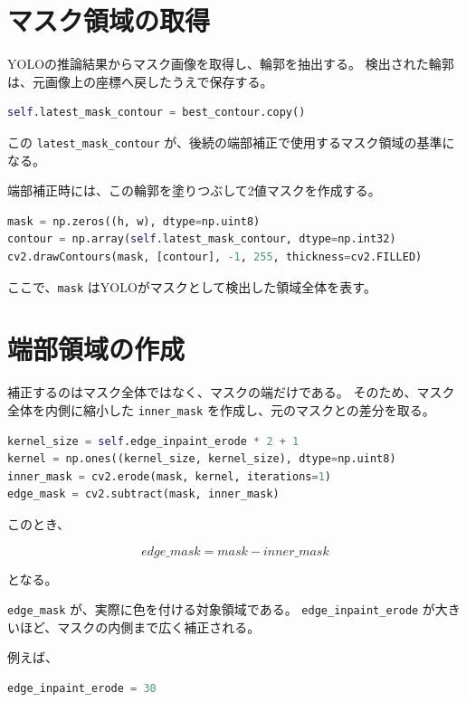\documentclass[uplatex,dvipdfmx]{jsarticle}
\begin{document}
\section{マスク領域の取得}

YOLOの推論結果からマスク画像を取得し、輪郭を抽出する。
検出された輪郭は、元画像上の座標へ戻したうえで保存する。

\begin{lstlisting}[language=Python]
self.latest_mask_contour = best_contour.copy()
\end{lstlisting}

この \texttt{latest\_mask\_contour} が、後続の端部補正で使用するマスク領域の基準になる。

端部補正時には、この輪郭を塗りつぶして2値マスクを作成する。

\begin{lstlisting}[language=Python]
mask = np.zeros((h, w), dtype=np.uint8)
contour = np.array(self.latest_mask_contour, dtype=np.int32)
cv2.drawContours(mask, [contour], -1, 255, thickness=cv2.FILLED)
\end{lstlisting}

ここで、\texttt{mask} はYOLOがマスクとして検出した領域全体を表す。

\section{端部領域の作成}

補正するのはマスク全体ではなく、マスクの端だけである。
そのため、マスク全体を内側に縮小した \texttt{inner\_mask} を作成し、元のマスクとの差分を取る。

\begin{lstlisting}[language=Python]
kernel_size = self.edge_inpaint_erode * 2 + 1
kernel = np.ones((kernel_size, kernel_size), dtype=np.uint8)
inner_mask = cv2.erode(mask, kernel, iterations=1)
edge_mask = cv2.subtract(mask, inner_mask)
\end{lstlisting}

このとき、

\begin{equation}
  edge\_mask = mask - inner\_mask
\end{equation}

となる。

\texttt{edge\_mask} が、実際に色を付ける対象領域である。
\texttt{edge\_inpaint\_erode} が大きいほど、マスクの内側まで広く補正される。

例えば、

\begin{lstlisting}[language=Python]
edge_inpaint_erode = 30
\end{lstlisting}
\end{document}
